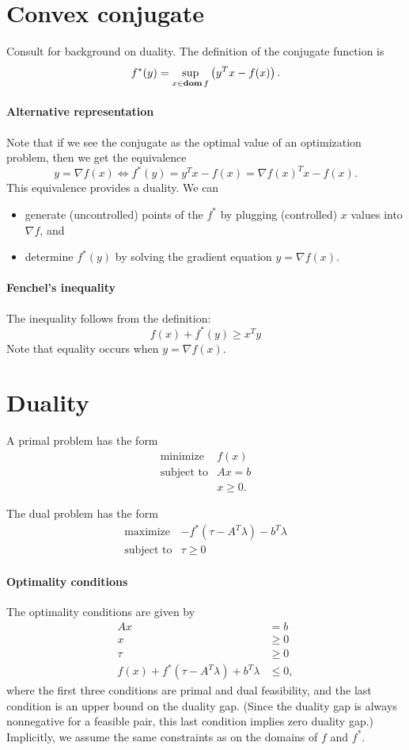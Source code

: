\documentclass[12pt]{article}
\begin{document}
\section{Convex conjugate}
Consult \cite{boyd2009convex} for background on duality.
The definition of the conjugate function is
\[
f^*(y) = \sup_{x \in \mathop{\bf dom} f} \left( y^T x - f(x) \right).
\]

\paragraph{Alternative representation}
Note that if we see the conjugate as the optimal value of an optimization
problem, then we get the equivalence
\[
y = \nabla f(x) \iff f^*(y) = y^T x - f(x) = \nabla f(x)^T x - f(x).
\]
This equivalence provides a duality.
We can
\begin{itemize}
\item generate (uncontrolled) points of the $f^*$ by plugging (controlled) $x$
values into $\nabla f$, and
\item determine $f^*(y)$ by solving the gradient equation $y = \nabla f(x)$.
\end{itemize}

\paragraph{Fenchel’s inequality} The inequality follows from the definition:
\[
f(x) + f^*(y) \geq x^T y
\]
Note that equality occurs when $y = \nabla f(x)$.

\section{Duality}
A primal problem has the form
\[
\begin{array}{ll}
\mbox{minimize} & f(x)\\
\mbox{subject to} & Ax = b\\
& x \geq 0.
\end{array}
\]

The dual problem has the form
\[
\begin{array}{ll}
\mbox{maximize} & -f^*(\tau - A^T \lambda) - b^T \lambda \\
\mbox{subject to} & \tau \geq 0
\end{array}
\]

\paragraph{Optimality conditions}
The optimality conditions are given by
\begin{align*}
A x &= b \\
x &\geq 0 \\
\tau &\geq 0 \\
f(x) + f^*(\tau - A^T \lambda) + b^T \lambda &\leq 0,
\end{align*}
where the first three conditions are primal and dual feasibility,
and the last condition is an upper bound on the duality gap.
(Since the duality gap is always nonnegative for a feasible pair,
this last condition implies zero duality gap.)
Implicitly, we assume the same constraints as on the domains of $f$ and $f^*$.
\end{document}
